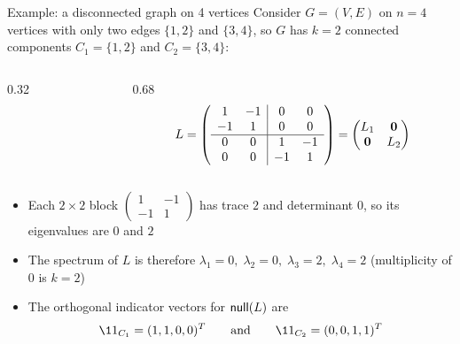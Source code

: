 \documentclass[aspectratio=169]{beamer}\usepackage[]{graphicx}\usepackage[]{xcolor}
\begin{document}
\begin{frame}{Example: a disconnected graph on 4 vertices}
Consider $G = (V, E)$ on $n = 4$ vertices with only two edges $\{1, 2\}$ and $\{3, 4\}$, so $G$ has $k = 2$ connected components $C_1 = \{1, 2\}$ and $C_2 = \{3, 4\}$:
\vfill
\begin{columns}[c]
\begin{column}{0.32\textwidth}
\centering
{}
\end{column}
\begin{column}{0.68\textwidth}
\[
L = \left(\begin{array}{cc|cc}
1 & -1 & 0 & 0 \\
-1 & 1 & 0 & 0 \\ \hline
0 & 0 & 1 & -1 \\
0 & 0 & -1 & 1
\end{array}\right) = \begin{pmatrix} L_1 & \b0 \\ \b0 & L_2 \end{pmatrix}
\]
\end{column}
\end{columns}
\vfill
\begin{itemize}
\item Each $2\times 2$ block $\begin{pmatrix} 1 & -1 \\ -1 & 1 \end{pmatrix}$ has trace $2$ and determinant $0$, so its eigenvalues are $0$ and $2$
\item The spectrum of $L$ is therefore $\lambda_1 = 0, \; \lambda_2 = 0, \; \lambda_3 = 2, \; \lambda_4 = 2$ (multiplicity of $0$ is $k = 2$)
\item The orthogonal indicator vectors for $\mathsf{null}(L)$ are
\[
\11_{C_1} = (1, 1, 0, 0)^T \qquad \text{and} \qquad \11_{C_2} = (0, 0, 1, 1)^T
\]
\end{itemize}
\end{frame}
\end{document}
